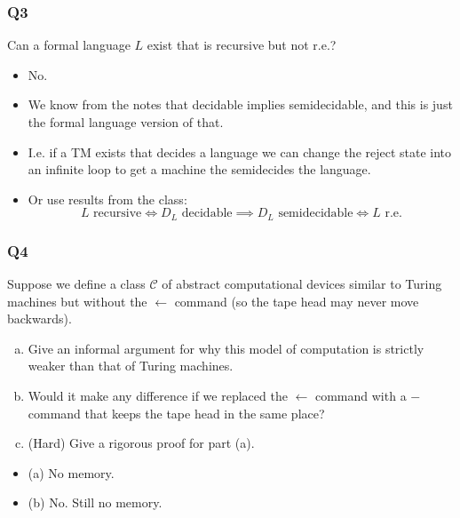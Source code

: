 \documentclass[handout]{beamer}
\newcommand{\la}{\leftarrow}
\begin{document}
\begin{frame}
\frametitle{Q3}
Can a formal language $L$ exist that is recursive but not r.e.?
\vspace{0.5cm}
\begin{itemize}
\item No. 
\item We know from the notes that decidable implies semidecidable, and this is just the formal language version of that.
\item I.e. if a TM exists that decides a language we can change the reject state into an infinite loop to get a machine the semidecides the language.
\item Or use results from the class:
\[L \text{ recursive} \iff D_L \text{ decidable} \implies D_L \text{ semidecidable} \iff L \text{ r.e.}\]
\end{itemize}

\end{frame}

\begin{frame}
\frametitle{Q4}
Suppose we define a class $\mathcal C$ of abstract computational devices similar to Turing machines but without the $\la$ command (so the tape head may never move backwards).
\begin{enumerate}[(a)]
\item Give an informal argument for why this model of computation is strictly weaker than that of Turing machines.
\item Would it make any difference if we replaced the $\la$ command with a $-$ command that keeps the tape head in the same place?
\item (Hard) Give a rigorous proof for part (a).
\end{enumerate}
\vspace{0.5cm}
\begin{itemize}
\item (a) No memory.
\item (b) No. Still no memory. 
\end{itemize}

\end{frame}
\end{document}

